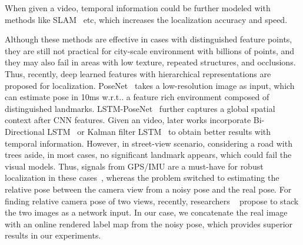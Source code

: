 \documentclass[10pt,twocolumn,letterpaper]{article}
\makeatletter
\DeclareRobustCommand\onedot{\futurelet\@let@token\@onedot}
\def\onedot{\ifx\@let@token.\else.\null\fi\xspace}
\def\wrt{w.r.t\onedot}
\def\etal{\emph{et al.}}
\makeatother
\begin{document}
When given a video, temporal information could be further modeled with methods like SLAM~\cite{engel2014lsd} etc, which increases the localization accuracy and speed.

Although these methods are effective in cases with distinguished feature points, they are still not practical for city-scale environment with billions of points, and they may also fail in areas with low texture, repeated structures, and occlusions.
Thus, recently, deep learned features with hierarchical representations are proposed for localization. PoseNet~\cite{Kendall_2015_ICCV,kendall2017geometric} takes a low-resolution image as input, which can estimate pose in 10ms \wrt a feature rich environment composed of distinguished landmarks. LSTM-PoseNet~\cite{hazirbasimage} further captures a global spatial context after CNN features.
Given an video, later works incorporate Bi-Directional LSTM~\cite{DBLP:journals/corr/ClarkWMTW17} or Kalman filter LSTM~\cite{coskun2017long} to obtain better results with temporal information. However, in street-view scenario, considering a road with trees aside, in most cases, no significant landmark appears, which could fail the visual models. Thus, signals from GPS/IMU are a must-have for robust localization in these cases~\cite{vishal2015accurate}, whereas the problem switched to estimating the relative pose between the camera view from a noisy pose and the real pose. For finding relative camera pose of two views, recently, researchers ~\cite{laskar2017camera,ummenhofer2016demon} propose to stack the two images as a network input. In our case, we concatenate the real image with an online rendered label map from the noisy pose, which provides superior results in our experiments.
\end{document}
